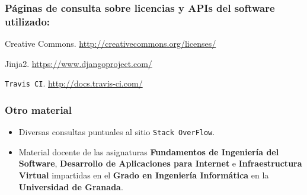 \subsubsection*{Páginas de consulta sobre licencias y APIs del software utilizado:}
 Creative Commons. \url{http://creativecommons.org/licenses/}

 Jinja2. \url{https://www.djangoproject.com/}

 {\tt Travis CI}. \url{http://docs.travis-ci.com/}

\bigskip


\subsubsection*{Otro material}
\begin{itemize}
	\item Diversas consultas puntuales al sitio {\tt Stack OverFlow}.
	\item Material docente de las asignaturas \textbf{Fundamentos de Ingeniería del Software}, \textbf{Desarrollo de Aplicaciones para Internet} e \textbf{Infraestructura Virtual} impartidas en el \textbf{Grado en Ingeniería Informática} en la \textbf{Universidad de Granada}.
\end{itemize}
